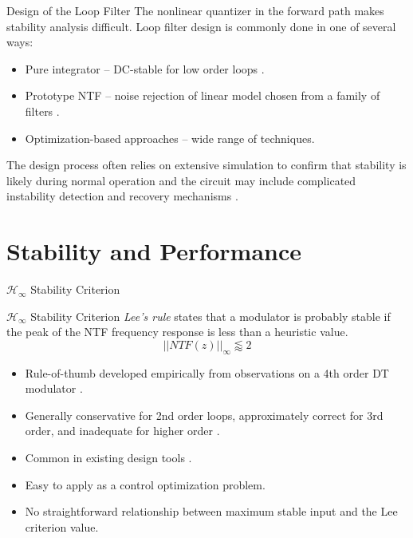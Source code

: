\documentclass[10pt,usenames,dvipsnames]{beamer}
\begin{document}
\begin{frame}{Design of the Loop Filter}
	The nonlinear quantizer in the forward path makes stability analysis difficult.
	Loop filter design is commonly done in one of several ways:
	\begin{itemize}
		\item Pure integrator -- DC-stable for low order loops \cite{Hein1993}.
		\item Prototype NTF -- noise rejection of linear model chosen from a family of filters \cite[Appx. B]{Schreier1997}.
		\item Optimization-based approaches -- wide range of techniques.
	\end{itemize}
	The design process often relies on extensive simulation to confirm that stability is likely during normal operation and the circuit may include complicated instability detection and recovery mechanisms \cite{Wong2004, Sooch1989, Moussavi1994, Eynde1991}.
\end{frame}

\section{Stability and Performance}

\begin{frame}{$\mathcal{H}_\infty$ Stability Criterion}

\begin{block}{$\mathcal{H}_\infty$ Stability Criterion}
	\emph{Lee's rule} states that a modulator is probably stable if the peak of the NTF frequency response is less than a heuristic value.
	\begin{equation*}
		||NTF(z)||_\infty \lessapprox 2
	\end{equation*}
\end{block}

\begin{itemize}
	\item Rule-of-thumb developed empirically from observations on a 4th order DT modulator \cite{Chao1990}.
	\item Generally conservative for 2nd order loops, approximately correct for 3rd order, and inadequate for higher order \cite{Schreier1993}.
	\item Common in existing design tools \cite[Appx. B]{Schreier1997}.
	\item Easy to apply as a control optimization problem.
	\item No straightforward relationship between maximum stable input and the Lee criterion value.
\end{itemize}

\end{frame}
\end{document}
